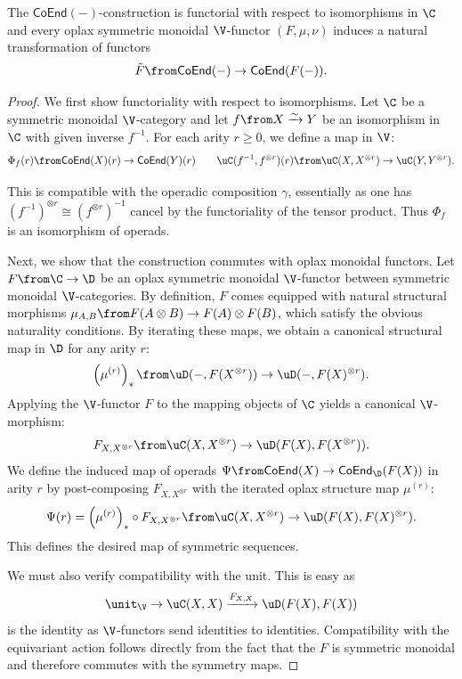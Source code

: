 \documentclass{tac}
\newcommand{\coend}{\mathsf{CoEnd}}
\begin{document}
\begin{proposition}
\label{prop2}
    The $\coend(-)$-construction is functorial with respect to isomorphisms in $\C$ and every oplax symmetric monoidal $\V$-functor $(F, \mu, \nu)$ induces a natural transformation of functors
    $$
    \tilde{F} \from \coend(-) \to \coend(F(-)).
    $$
\end{proposition}
\begin{proof}
    We first show functoriality with respect to isomorphisms. Let $\C$ be a symmetric monoidal $\V$-category and let $f\from X \xrightarrow{\sim} Y$ be an isomorphism in $\C$ with given inverse $f^{-1}$. For each arity $r \geq 0$, we define a map in $\V$:
    $$
    \Phi_f(r)\from \coend(X)(r) \to \coend(Y)(r) \qquad  \uC(f^{-1}, f^{\otimes r})(r)\from \uC(X, X^{\otimes r}) \to \uC(Y, Y^{\otimes r}).
    $$
 
   This is compatible with the operadic composition $\gamma$, essentially as one has $(f^{-1})^{\otimes r} \cong (f^{\otimes r})^{-1}$ cancel by the functoriality of the tensor product.  Thus $\Phi_f$ is an isomorphism of operads.

    Next, we show that the construction commutes with oplax monoidal functors. Let $F\from \C \to \D$ be an oplax symmetric monoidal $\V$-functor between symmetric monoidal $\V$-categories. By definition, $F$ comes equipped with natural structural morphisms $\mu_{A,B} \from F(A \otimes B) \to F(A) \otimes F(B)$, which satisfy the obvious naturality conditions. By iterating these maps, we obtain a canonical structural map in $\D$ for any arity $r$:
    $$
    \left( \mu^{(r)} \right)_\ast \from \uD( -, F(X^{\otimes r})) \to \uD( -, F(X)^{\otimes r}).
    $$
    Applying the $\V$-functor $F$ to the mapping objects of $\C$ yields a canonical $\V$-morphism:
    $$
    F_{X, X^{\otimes r}}\from \uC(X, X^{\otimes r}) \to \uD(F(X), F(X^{\otimes r})).
    $$
    We define the induced map of operads $\Psi\from \coend(X) \to \coend_\D(F(X))$ in arity $r$ by post-composing $F_{X, X^{\otimes r}}$ with the iterated oplax structure map $\mu^{(r)}$:
    $$
    \Psi(r) = \left( \mu^{(r)}\right)_\ast \circ F_{X, X^{\otimes r}}\from \uC(X, X^{\otimes r}) \to \uD(F(X), F(X)^{\otimes r}).
    $$
    This defines the desired map of symmetric sequences.

    We must also verify compatibility with the unit. This is easy as 
    $$
    \unit_{\V} \to \uC(X, X) \xrightarrow{F_{X,X}} \uD(F(X), F(X))
    $$
    is the identity as  $\V$-functors send identities to identities.
    Compatibility with the equivariant action follows directly from the fact that the $F$ is symmetric monoidal and therefore commutes with the symmetry maps.
    

\end{proof}
\end{document}
